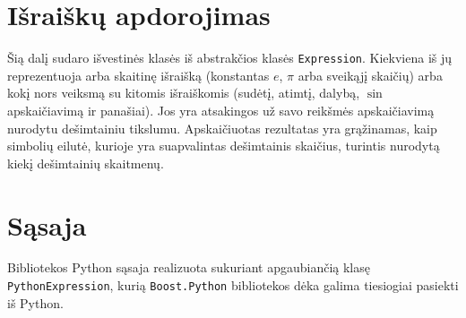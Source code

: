 \section{Išraiškų apdorojimas}

Šią dalį sudaro išvestinės klasės iš abstrakčios klasės \verb|Expression|.
Kiekviena iš jų reprezentuoja arba skaitinę išraišką (konstantas $e$,
$\pi$ arba sveikąjį skaičių) arba kokį nors veiksmą su kitomis išraiškomis
(sudėtį, atimtį, dalybą, $\sin$ apskaičiavimą ir panašiai). Jos yra 
atsakingos už savo reikšmės apskaičiavimą nurodytu dešimtainiu tikslumu.
Apskaičiuotas rezultatas yra grąžinamas, kaip simbolių eilutė, kurioje yra
suapvalintas dešimtainis skaičius, turintis nurodytą kiekį dešimtainių
skaitmenų.

\section{Sąsaja}

Bibliotekos Python sąsaja realizuota sukuriant apgaubiančią klasę
\verb|PythonExpression|, kurią \verb|Boost.Python| bibliotekos dėka
galima tiesiogiai pasiekti iš Python.
